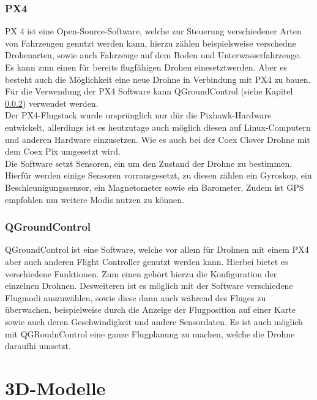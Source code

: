 \subsubsection{PX4} \label{px4:subsection}
PX 4 ist eine Open-Source-Software, welche zur Steuerung verschiedener Arten von Fahrzeugen genutzt werden kann, hierzu zählen beispielsweise verschedne Drohenarten, sowie auch Fahrzeuge auf dem Boden und Unterwasserfahrzeuge.\\ Es kann zum einen für bereits flugfähigen Drohen einesetztwerden. Aber es besteht auch die Möglichkeit eine neue Drohne in Verbindung mit PX4 zu bauen.\\
Für die Verwendung der PX4 Software kann QGroundControl (siehe Kapitel \ref{qGroundControl:subsection}) verwendet werden. \cite[vgl.][]{px4} \\
Der PX4-Flugstack wurde ursprünglich nur dür die Pixhawk-Hardware entwickelt, allerdings ist es heutzutage auch möglich diesen auf Linux-Computern und anderen Hardware einzusetzen. Wie es auch bei der Coex Clover Drohne mit dem Coex Pix umgesetzt wird. \\
Die Software setzt Sensoren, ein um den Zustand der Drohne zu bestimmen. Hierfür werden einige Sensoren vorrausgesetzt, zu diesen zählen ein Gyroskop, ein Beschleunigungssensor, ein Magnetometer sowie ein Barometer. Zudem ist GPS empfohlen um weitere Modis nutzen zu können. \cite[vgl.][]{px4}

\subsubsection{QGroundControl}  \label{qGroundControl:subsection}
QGroundControl ist eine Software, welche vor allem für Drohnen mit einem PX4 aber auch anderen Flight Controller genutzt werden kann. Hierbei bietet es verschiedene Funktionen. Zum einen gehört hierzu die Konfiguration der einzelnen  Drohnen. Desweiteren ist es möglich mit der Software verschiedene Flugmodi auszuwählen, sowie diese dann auch während des Fluges zu überwachen, beispielweise durch die Anzeige der Flugposition auf einer Karte sowie auch deren Geschwindigkeit und andere Sensordaten.
Es ist auch möglich mit QGRoudnControl eine ganze Flugplanung zu machen, welche die Drohne daraufhi umsetzt. \cite[vgl.][]{qGroundControl}

\section{3D-Modelle} \label{3d-modelle:section}

